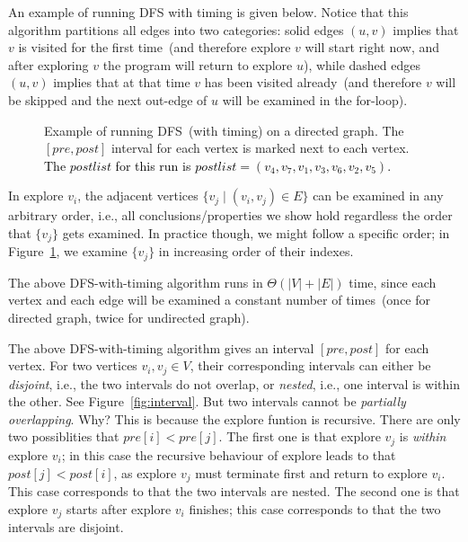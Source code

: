 \begin{minipage}{0.8\textwidth}
	\xxx
	\xxx
	\xxx
	\xxx
	\xxx
	\xxx
	\xxx
	\xxx
	\xxx
	\xxx
	\xxx
\end{minipage}

An example of running DFS with timing is given below.
Notice that this algorithm partitions all edges into two categories:
solid edges $(u,v)$ implies that $v$ is visited for the first time~(and therefore explore $v$ will start right now, and after exploring
$v$ the program will return to explore $u$),
while dashed edges $(u,v)$ implies that at that time $v$ has been visited already~(and therefore $v$ will be skipped and the next 
out-edge of $u$ will be examined in the for-loop). 

\begin{figure}[h!]
\centering{}
\caption{Example of running DFS~(with timing) on a directed graph. 
The $[pre,post]$ interval for each vertex
is marked next to each vertex. 
\textcolor{black}{The $postlist$ for this run is $postlist = (v_4,v_7,v_1,v_3,v_6,v_2,v_5)$.}}
\label{fig:dfs-directed}
\end{figure}


In explore $v_i$, the adjacent vertices $\{v_j \mid
(v_i, v_j)\in E\}$ can be examined in any arbitrary order, i.e., all
conclusions/properties we show hold regardless the order that $\{v_j\}$ gets examined.
In practice though, we might follow a specific order;
in Figure~\ref{fig:dfs-directed}, we examine $\{v_j\}$ in increasing order of their indexes.

The above DFS-with-timing algorithm runs in $\Theta(|V| + |E|)$ time, since
each vertex and each edge will be examined a constant number of times~(once for
directed graph, twice for undirected graph).


The above DFS-with-timing algorithm gives an interval $[pre,post]$ for each vertex.
For two vertices $v_i,v_j\in V$, their corresponding intervals can either be
\emph{disjoint}, i.e., the two intervals do not overlap, or \emph{nested}, i.e.,
one interval is within the other. See Figure~\ref{fig:interval}.
But two intervals cannot be \emph{partially overlapping}. Why? This is because
the explore funtion is recursive. There are only two possiblities
that $pre[i] < pre[j]$. The first one is that explore $v_j$ is \emph{within} explore $v_i$;
in this case the recursive behaviour of explore leads to that $post[j] < post[i]$,
as explore $v_j$ must terminate first and return to explore $v_i$.
This case corresponds to that the two intervals are nested.
The second one is that explore $v_j$ starts after explore $v_i$ finishes;
this case corresponds to that the two intervals are disjoint.

